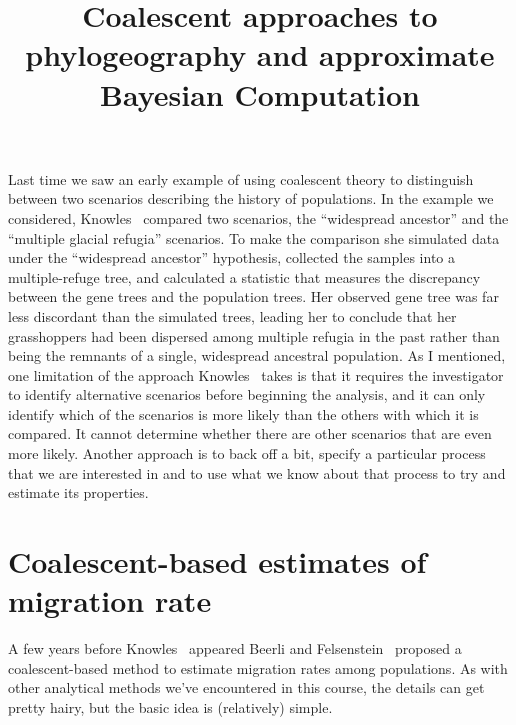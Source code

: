 \documentclass[12pt]{article}
\title{Coalescent approaches to phylogeography and approximate
  Bayesian Computation}
\begin{document}
\maketitle

\thispagestyle{first}

Last time we saw an early example of using coalescent theory to
distinguish between two scenarios describing the history of
populations. In the example we considered, Knowles~\cite{Knowles-2001}
compared two scenarios, the ``widespread ancestor'' and the ``multiple
glacial refugia'' scenarios. To make the comparison she simulated data
under the ``widespread ancestor'' hypothesis, collected the samples
into a multiple-refuge tree, and calculated a statistic that measures
the discrepancy between the gene trees and the population trees. Her
observed gene tree was far less discordant than the simulated trees,
leading her to conclude that her grasshoppers had been dispersed among
multiple refugia in the past rather than being the remnants of a
single, widespread ancestral population. As I mentioned, one
limitation of the approach Knowles~\cite{Knowles-2001} takes is that
it requires the investigator to identify alternative scenarios before
beginning the analysis, and it can only identify which of the
scenarios is more likely than the others with which it is compared. It
cannot determine whether there are other scenarios that are even more
likely. Another approach is to back off a bit, specify a particular
process that we are interested in and to use what we know about that
process to try and estimate its properties.

\section*{Coalescent-based estimates of migration rate}

A few years before Knowles~\cite{Knowles-2001} appeared Beerli and
Felsenstein~\cite{Beerli-Felsenstein-1999,Beerli-Felsenstein-2001}
proposed a coalescent-based method to estimate migration rates among
populations. As with other analytical methods we've encountered in
this course, the details can get pretty hairy, but the basic idea is
(relatively) simple.
\end{document}
